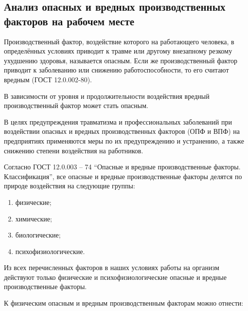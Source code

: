 \subsection{Анализ опасных и вредных производственных факторов на рабочем месте}
Производственный фактор, воздействие которого на работающего человека, в определённых условиях приводит к травме или другому внезапному резкому ухудшению здоровья, называется опасным. Если же производственный фактор приводит к заболеванию или снижению работоспособности, то его считают вредным (ГОСТ 12.0.002-80).

В зависимости от уровня и продолжительности воздействия вредный производственный фактор может стать опасным.

В целях предупреждения травматизма и профессиональных заболеваний при воздействии опасных и вредных производственных факторов (ОПФ и ВПФ) на предприятиях применяются меры по их предупреждению и устранению, а также снижению степени воздействия на работников.

Согласно ГОСТ 12.0.003 – 74 ``Опасные и вредные производственные факторы. Классификация'', все опасные и вредные производственные факторы делятся по природе воздействия на следующие группы:

\begin{enumerate}
\item физические;
\item химические;
\item биологические;
\item психофизиологические.
\end{enumerate}
Из всех перечисленных факторов в наших условиях работы на организм действуют только физические и психофизиологические опасные и вредные производственные факторы.

К физическим опасным и вредным производственным факторам можно отнести:

